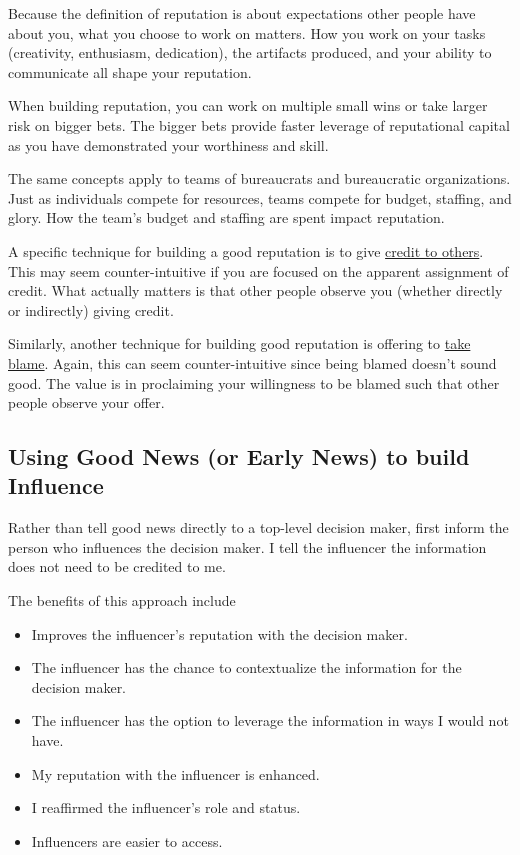 Because the definition of reputation is about expectations other people have about you, what you choose to work on matters. How you work on your tasks (creativity, enthusiasm, dedication), the artifacts produced, and your ability to communicate all shape your reputation. 

When building reputation, you can work on multiple small wins or take larger risk on bigger bets. The bigger bets provide faster leverage of reputational capital as you have demonstrated your worthiness and skill. 

The same concepts apply to teams of bureaucrats and bureaucratic organizations. Just as individuals compete for resources, teams compete for budget, staffing, and glory. How the team's budget and staffing are spent impact reputation. 

A specific technique for building a good reputation is to give 
\hyperref[sec:credit-others]{credit to others}. 
This may seem counter-intuitive if you are focused on the apparent assignment of credit. What actually matters is that other people observe you (whether directly or indirectly) giving credit. 

Similarly, another technique for building good reputation is offering to \hyperref[sec:take-blame]{take blame}.
Again, this can seem counter-intuitive since being blamed doesn't sound good. The value is in proclaiming your willingness to be blamed such that other people observe your offer. 

\subsection*{Using Good News (or Early News) to build Influence}

Rather than tell good news directly to a top-level decision maker, first inform the person who influences the decision maker.
I tell the influencer the information does not need to be credited to me.

The benefits of this approach include
\begin{itemize}
    \item Improves the influencer's reputation with the decision maker.
    \item The influencer has the chance to contextualize the information for the decision maker.
    \item The influencer has the option to leverage the information in ways I would not have.
    \item My reputation with the influencer is enhanced.
    \item I reaffirmed the influencer's role and status.
    \item Influencers are easier to access.
\end{itemize}

